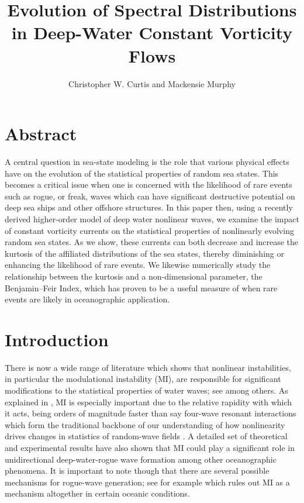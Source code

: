 \documentclass[a4paper,11pt]{article}
\title{Evolution of Spectral Distributions in Deep-Water Constant Vorticity Flows}
\author{Christopher W. Curtis and Mackensie Murphy}
\date{}
\begin{document}
\maketitle
\section*{Abstract}
A central question in sea-state modeling is the role that various physical effects have on the evolution of the statistical properties of random sea states.  This becomes a critical issue when one is concerned with the likelihood of rare events such as rogue, or freak, waves which can have significant destructive potential on deep sea ships and other offshore structures.  In this paper then, using a recently derived higher-order model of deep water nonlinear waves, we examine the impact of constant vorticity currents on the statistical properties of nonlinearly evolving random sea states.  As we show, these currents can both decrease and increase the kurtosis of the affiliated distributions of the sea states, thereby diminishing or enhancing the likelihood of rare events.   We likewise numerically study the relationship between the kurtosis and a non-dimensional parameter, the Benjamin--Feir Index, which has proven to be a useful measure of when rare events are likely in oceanographic application.  

\section{Introduction}
There is now a wide range of literature which shows that nonlinear instabilities, in particular the modulational instability (MI), are responsible for significant modifications to the statistical properties of water waves; see \cite{dysthe2,dysthe3,onorato,thomas2012nonlinear} among others.   As explained in \cite{janssen}, MI is especially important due to the relative rapidity with which it acts, being orders of magnitude faster than say four-wave resonant interactions which form the traditional backbone of our understanding of how nonlinearity drives changes in statistics of random-wave fields \cite{hasselmann,holthuijsen}.  A detailed set of theoretical and experimental results \cite{sergeeva1,sergeeva2,sergeeva3,sergeeva4} have also shown that MI could play a significant role in unidirectional deep-water-rogue wave formation among other oceanographic phenomena.  It is important to note though that there are several possible mechanisms for rogue-wave generation; see \cite{fedele} for example which rules out MI as a mechanism altogether in certain oceanic conditions.  
\end{document}
